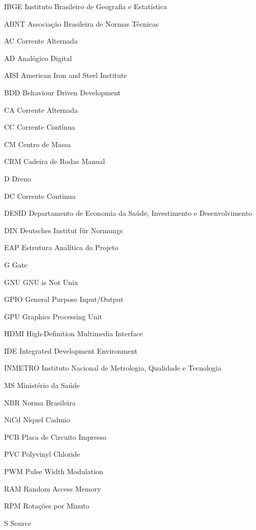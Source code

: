 \begin{siglas}
	\item[IBGE]	 Instituto Brasileiro de Geografia e Estatística
    \item [ABNT]	 Associação Brasileira de Normas Técnicas
    \item [AC]	 Corrente Alternada
    \item [AD]	 Analógico Digital
    \item [AISI]	 American Iron and Steel Institute
    \item [BDD]	 Behaviour Driven Development
    \item [CA]	 Corrente Alternada
    \item [CC]	 Corrente Contínua
    \item [CM]	 Centro de Massa
    \item [CRM]	 Cadeira de Rodas Manual
    \item [D]	 Dreno
    \item [DC]	 Corrente Continua
    \item [DESID]	 Departamento de Economia da Saúde, Investimento e Desenvolvimento
    \item [DIN]	 Deutsches Institut für Normungs
    \item [EAP]	 Estrutura Analítica do Projeto
    \item [G]	 Gate
    \item [GNU]	 GNU is Not Unix
    \item [GPIO]	 General Purpose Input/Output
    \item [GPU]	 Graphics Processing Unit
    \item [HDMI]	 High-Definition Multimedia Interface
    \item [IDE]	 Integrated Development Environment
    \item [INMETRO]	 Instituto Nacional de Metrologia, Qualidade e Tecnologia
    \item [MS]	 Ministério da Saúde
    \item [NBR]	 Norma Brasileira
    \item [NiCd]	 Níquel Cadmio
    \item [PCB]	 Placa de Circuito Impresso
    \item [PVC]	 Polyvinyl Chloride
    \item [PWM]	 Pulse Width Modulation
    \item [RAM]	 Random Access Memory
    \item [RPM]	 Rotações por Minuto
    \item [S]	 Source

\end{siglas}
